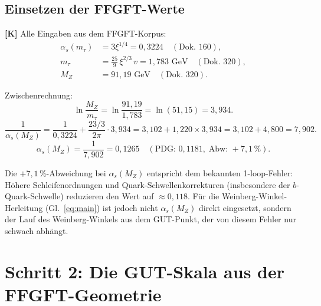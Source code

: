 \subsection{Einsetzen der FFGFT-Werte}

\textbf{[K]} Alle Eingaben aus dem FFGFT-Korpus:
\begin{align}
  \alpha_s(m_\tau) &= 3\xi^{1/4} = 0{,}3224
    \quad(\text{Dok.~160}),
    \label{eq:alphas_tau}\\
  m_\tau &= \frac{25}{9}\,\xi^{2/3}\,v = 1{,}783\text{ GeV}
    \quad(\text{Dok.~320}),
    \label{eq:mtau}\\
  M_Z &= 91{,}19\text{ GeV}
    \quad(\text{Dok.~320}).
    \label{eq:MZ}
\end{align}

Zwischenrechnung:
\begin{equation}
  \ln\!\frac{M_Z}{m_\tau}
  = \ln\!\frac{91{,}19}{1{,}783} = \ln(51{,}15) = 3{,}934.
  \label{eq:lnMZ}
\end{equation}
\begin{equation}
  \frac{1}{\alpha_s(M_Z)}
  = \frac{1}{0{,}3224} + \frac{23/3}{2\pi}\cdot 3{,}934
  = 3{,}102 + 1{,}220 \times 3{,}934
  = 3{,}102 + 4{,}800 = 7{,}902.
\end{equation}
\begin{equation}
  \boxed{\alpha_s(M_Z) = \frac{1}{7{,}902} = 0{,}1265}
  \quad(\text{PDG: }0{,}1181{,}\;\text{Abw: }+7{,}1\,\%).
  \label{eq:alphas_MZ}
\end{equation}

\begin{tcolorbox}[colback=blue!4!white, colframe=blue!45!black,
  title={Hinweis zur Abweichung von $\alpha_s(M_Z)$}]
Die $+7{,}1\,\%$-Abweichung bei $\alpha_s(M_Z)$ entspricht dem
bekannten 1-loop-Fehler: Höhere Schleifenordnungen und
Quark-Schwellenkorrekturen (insbesondere der $b$-Quark-Schwelle)
reduzieren den Wert auf $\approx 0{,}118$. Für die Weinberg-Winkel-Herleitung
(Gl.~\eqref{eq:main}) ist jedoch nicht $\alpha_s(M_Z)$ direkt
eingesetzt, sondern der Lauf des Weinberg-Winkels aus dem GUT-Punkt,
der von diesem Fehler nur schwach abhängt.
\end{tcolorbox}

\section{Schritt 2: Die GUT-Skala aus der FFGFT-Geometrie}

